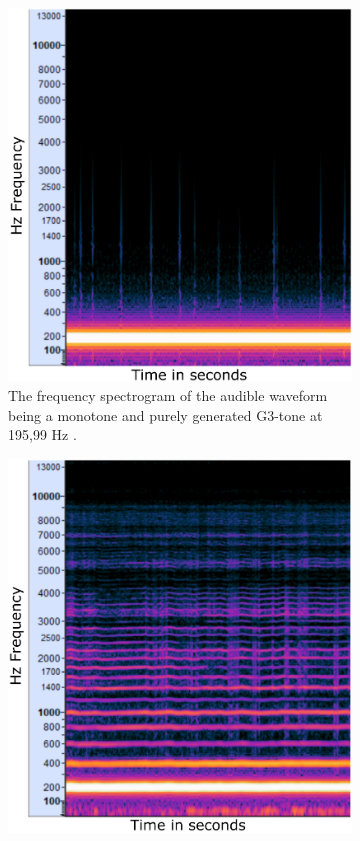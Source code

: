\begin{figure}[ht!]
	\centering
		\begin{subfigure}[t]{.5\textwidth}
			\centering\captionsetup{width=.9\linewidth}%
			\includegraphics[width=0.9\linewidth]{Assets/Figures/G3_196Hz_PureTone_waveform_spectrogram.pdf}
			\caption{The frequency spectrogram of the audible waveform being a monotone and purely generated G3-tone at 195,99 Hz \cite{generate_tones}.}
			\label{fig:sub:G3_pure_waveform}
		\end{subfigure}%
		\begin{subfigure}[t]{.5\textwidth}
			\centering\captionsetup{width=.9\linewidth}%
			\includegraphics[width=0.9\linewidth]{Assets/Figures/G3_196Hz_HummingWaveform_FrequencySpectrum.pdf}

\end{subfigure}
\end{figure}
